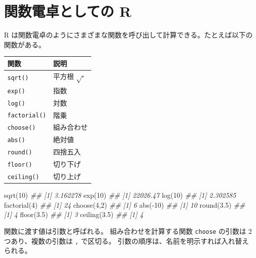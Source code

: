 \documentclass[
  letterpaper,
  xelatex,
  ja=standard, xelatex]{bxjsbook}
\newenvironment{Shaded}{\begin{snugshade}}{\end{snugshade}}
\newcommand{\DecValTok}[1]{\textcolor[rgb]{0.68,0.00,0.00}{#1}}
\newcommand{\DocumentationTok}[1]{\textcolor[rgb]{0.37,0.37,0.37}{\textit{#1}}}
\newcommand{\FloatTok}[1]{\textcolor[rgb]{0.68,0.00,0.00}{#1}}
\newcommand{\FunctionTok}[1]{\textcolor[rgb]{0.28,0.35,0.67}{#1}}
\newcommand{\NormalTok}[1]{\textcolor[rgb]{0.00,0.23,0.31}{#1}}
\newcommand{\SpecialCharTok}[1]{\textcolor[rgb]{0.37,0.37,0.37}{#1}}
\begin{document}
\section{関数電卓としての
R}\label{ux95a2ux6570ux96fbux5353ux3068ux3057ux3066ux306e-r}

R
は関数電卓のようにさまざまな関数を呼び出して計算できる。たとえば以下の関数がある。

\begin{longtable}[]{@{}ll@{}}
\toprule\noalign{}
関数 & 説明 \\
\midrule\noalign{}
\endhead
\bottomrule\noalign{}
\endlastfoot
\texttt{sqrt()} & 平方根 \(\sqrt{\cdot}\) \\
\texttt{exp()} & 指数 \\
\texttt{log()} & 対数 \\
\texttt{factorial()} & 階乗 \\
\texttt{choose()} & 組み合わせ \\
\texttt{abs()} & 絶対値 \\
\texttt{round()} & 四捨五入 \\
\texttt{floor()} & 切り下げ \\
\texttt{ceiling()} & 切り上げ \\
\end{longtable}

\begin{Shaded}
\begin{Highlighting}[]
\FunctionTok{sqrt}\NormalTok{(}\DecValTok{10}\NormalTok{)}
\DocumentationTok{\#\# [1] 3.162278}
\FunctionTok{exp}\NormalTok{(}\DecValTok{10}\NormalTok{)}
\DocumentationTok{\#\# [1] 22026.47}
\FunctionTok{log}\NormalTok{(}\DecValTok{10}\NormalTok{)}
\DocumentationTok{\#\# [1] 2.302585}
\FunctionTok{factorial}\NormalTok{(}\DecValTok{4}\NormalTok{)}
\DocumentationTok{\#\# [1] 24}
\FunctionTok{choose}\NormalTok{(}\DecValTok{4}\NormalTok{,}\DecValTok{2}\NormalTok{)}
\DocumentationTok{\#\# [1] 6}
\FunctionTok{abs}\NormalTok{(}\SpecialCharTok{{-}}\DecValTok{10}\NormalTok{)}
\DocumentationTok{\#\# [1] 10}
\FunctionTok{round}\NormalTok{(}\FloatTok{3.5}\NormalTok{)}
\DocumentationTok{\#\# [1] 4}
\FunctionTok{floor}\NormalTok{(}\FloatTok{3.5}\NormalTok{)}
\DocumentationTok{\#\# [1] 3}
\FunctionTok{ceiling}\NormalTok{(}\FloatTok{3.5}\NormalTok{)}
\DocumentationTok{\#\# [1] 4}
\end{Highlighting}
\end{Shaded}

関数に渡す値は引数と呼ばれる。 組み合わせを計算する関数 \texttt{choose}
の引数は 2 つあり、複数の引数は \texttt{,} で区切る。
引数の順序は、名前を明示すれば入れ替えられる。
\end{document}
